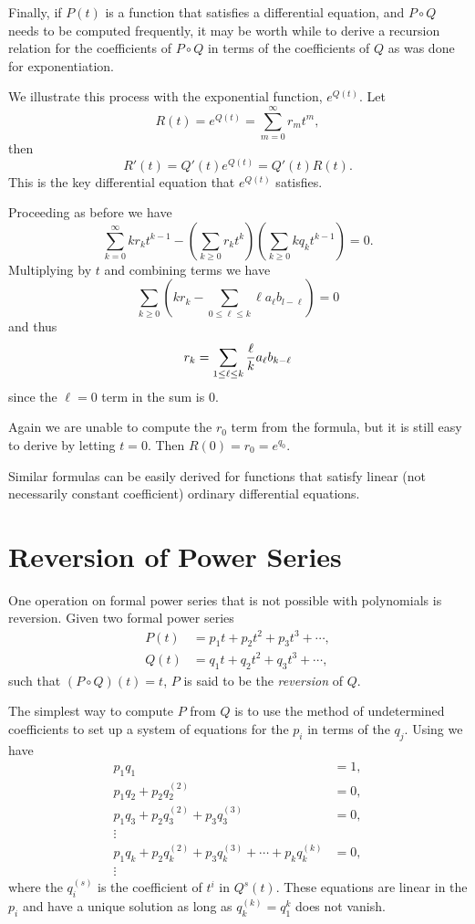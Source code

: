 Finally, if $P(t)$ is a function that satisfies a differential
equation, and $P \circ Q$ needs to be computed frequently, it may be
worth while to derive a recursion relation for the coefficients of
$P\circ Q$ in terms of the coefficients of $Q$ as was done for
exponentiation.

We illustrate this process with the exponential function, $e^{Q(t)}$.
Let 
\[
R(t) = e^{Q(t)} = \sum _{m=0}^\infty r_m t^m,
\]
then 
\[
R'(t) = Q'(t) e^{Q(t)} = Q'(t) R(t).
\]
This is the key differential equation that $e^{Q(t)}$ satisfies.  

Proceeding as before we have 
\[
\sum_{k=0}^\infty k r_k t^{k-1} -
\left(\sum_{k\ge 0} r_k t^k\right)
\left(\sum_{k\ge 0} k q_k t^{k-1}\right) = 0.
\]
Multiplying by $t$ and combining terms we have 
\[
\sum_{k\ge 0}\left(k r_k - \sum_{0 \le \ell \le k} \ell a_{\ell}
b_{l-\ell}\right) = 0
\]
and thus 
\[
r_k = \sum_{1 \le \ell \le k} {\ell \over k} a_{\ell} b_{k-\ell}
\]
since the $\ell = 0$ term in the sum is $0$.  

Again we are unable to compute the $r_0$ term from the formula, but it
is still easy to derive by letting $t = 0$.  Then $R(0) = r_0 =
e^{q_0}$.

Similar formulas can be easily derived for functions that satisfy linear 
(not necessarily constant coefficient) ordinary differential equations.


\section{Reversion of Power Series}
\label{FPS:Revert:Sec}

One operation on formal power series that is not possible with
polynomials is reversion.  Given two formal power series
\[
\begin{aligned}
P(t) & = p_1 t + p_2 t^2 + p_3 t^3 + \cdots, \\
Q(t) & = q_1 t + q_2 t^2 + q_3 t^3 + \cdots,
\end{aligned}
\]
such that $(P \circ Q)(t) = t$, $P$ is said to be the {\em
reversion} of $Q$.

The simplest way to compute $P$ from $Q$ is to use the method of
undetermined coefficients to set up a system of equations for the
$p_i$ in terms of the $q_j$.  Using  we
have
\[
\begin{aligned}
p_1 q_1 &= 1, \\
p_1 q_2 + p_2 q^{(2)}_2 &= 0, \\
p_1 q_3 + p_2 q^{(2)}_3 + p_3 q^{(3)}_3 &= 0, \\
\vdots\\
p_1 q_k + p_2 q^{(2)}_k + p_3 q^{(3)}_k + \cdots + p_k q^{(k)}_k &= 0,\\
\vdots
\end{aligned}
\]
where the $q^{(s)}_i$ is the coefficient of $t^i$ in $Q^s(t)$.
These equations are linear in the $p_i$ and have a unique solution as
long as $q^{(k)}_k = q_1^k$ does not vanish.

